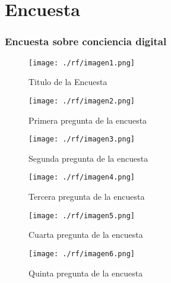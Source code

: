 \chapter{Encuesta}
\subsection{Encuesta sobre conciencia digital}\label{section:Resultados}

\begin{figure}[H]
    \centering %
        \texttt{[image: ./rf/imagen1.png]} 
    \caption{Titulo de la Encuesta \cite{GOOGLE-FORMS}}
   \label{figure:Resultado 1}  %
\end{figure}
\begin{figure}[H]
    \centering %
          \texttt{[image: ./rf/imagen2.png]} 
    \caption{Primera pregunta de la encuesta \cite{GOOGLE-FORMS}}
   \label{figure:Resultado 2} %
\end{figure}
\begin{figure}[H]
    \centering %
          \texttt{[image: ./rf/imagen3.png]} 
    \caption{Segunda pregunta de la encuesta \cite{GOOGLE-FORMS}}
   \label{figure:Resultado 3} %
\end{figure}
\begin{figure}[H]
    \centering %
          \texttt{[image: ./rf/imagen4.png]} 
    \caption{Tercera pregunta de la encuesta \cite{GOOGLE-FORMS}}
   \label{figure:Resultado 5} %
\end{figure}
\begin{figure}[H]
    \centering %
          \texttt{[image: ./rf/imagen5.png]} 
    \caption{Cuarta pregunta de la encuesta \cite{GOOGLE-FORMS}}
   \label{figure:Resultado 6} %
\end{figure}
\begin{figure}[H]
    \centering %
          \texttt{[image: ./rf/imagen6.png]} 
    \caption{Quinta pregunta de la encuesta \cite{GOOGLE-FORMS}}
   \label{figure:Resultado 7} %
\end{figure}
